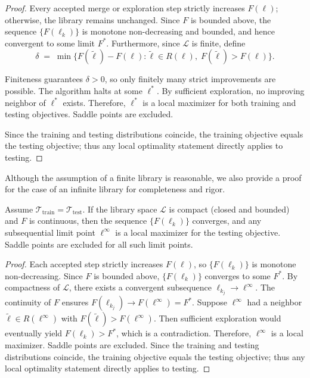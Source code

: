 \documentclass[sigconf, nonacm]{acmart}
\begin{document}
\begin{proof}
Every accepted merge or exploration step strictly increases $F(\ell)$; otherwise, the library remains unchanged. Since $F$ is bounded above, the sequence $\{F(\ell_k)\}$ is monotone non-decreasing and bounded, and hence convergent to some limit $F^*$. Furthermore, since $\mathcal{L}$ is finite, define
\[
\delta \;=\; \min \big\{ F(\tilde{\ell}) - F(\ell) : \tilde{\ell} \in R(\ell),\; F(\tilde{\ell}) > F(\ell) \big\}.
\]

Finiteness guarantees $\delta>0$, so only finitely many strict improvements are possible. The algorithm halts at some $\ell^*$. By sufficient exploration, no improving neighbor of $\ell^*$ exists. Therefore, $\ell^*$ is a local maximizer for both training and testing objectives. Saddle points are excluded.

Since the training and testing distributions coincide, the training objective equals the testing objective; thus any local optimality statement directly applies to testing.
\end{proof}
Although the assumption of a finite library is reasonable, we also provide a proof for the case of an infinite library for completeness and rigor.
\begin{theorem}
Assume $\mathcal{T}_{\mathrm{train}} = \mathcal{T}_{\mathrm{test}}$. 
If the library space $\mathcal{L}$ is compact (closed and bounded) and $F$ is continuous, then the sequence $\{F(\ell_k)\}$ converges, and any subsequential limit point $\ell^\infty$ is a local maximizer for the testing objective. 
Saddle points are excluded for all such limit points.
\label{thm:infinite}
\end{theorem}

\begin{proof}
Each accepted step strictly increases $F(\ell)$, so $\{F(\ell_k)\}$ is monotone non-decreasing. Since $F$ is bounded above, $\{F(\ell_k)\}$ converges to some $F^*$. By compactness of $\mathcal{L}$, there exists a convergent subsequence $\ell_{k_j}\to\ell^\infty$. The continuity of $F$ ensures $F(\ell_{k_j}) \to F(\ell^\infty)=F^*$. Suppose $\ell^\infty$ had a neighbor $\tilde{\ell}\in R(\ell^\infty)$ with $F(\tilde{\ell})>F(\ell^\infty)$. Then sufficient exploration would eventually yield $F(\ell_{k}) > F^*$, which is a contradiction. Therefore, $\ell^\infty$ is a local maximizer. Saddle points are excluded. Since the training and testing distributions coincide, the training objective equals the testing objective; thus any local optimality statement directly applies to testing.
\end{proof}
\end{document}
